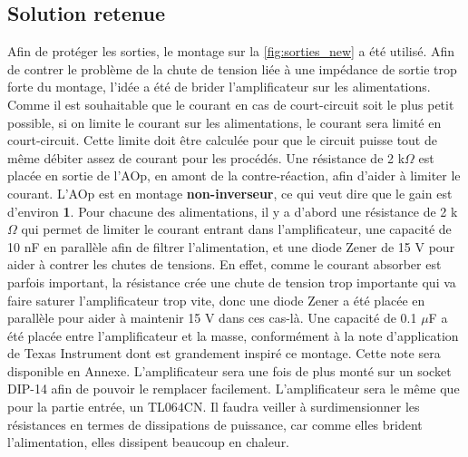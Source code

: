 \documentclass{report}
\begin{document}
\subsection{Solution retenue}
Afin de protéger les sorties, le montage sur la  \ref{fig:sorties_new} a été utilisé. Afin de contrer le problème de la chute de tension liée à une impédance de sortie trop forte du montage, l'idée a été de brider l'amplificateur sur les alimentations. Comme il est souhaitable que le courant en cas de court-circuit soit le plus petit possible, si on limite le courant sur les alimentations, le courant sera limité en court-circuit. Cette limite doit être calculée pour que le circuit puisse tout de même débiter assez de courant pour les procédés. Une résistance de 2 k$\Omega$ est placée en sortie de l'AOp, en amont de la contre-réaction, afin d'aider à limiter le courant. L'AOp est en montage \textbf{non-inverseur}, ce qui veut dire que le gain est d'environ \textbf{1}. Pour chacune des alimentations, il y a d'abord une résistance de 2 k$\Omega$ qui permet de limiter le courant entrant dans l'amplificateur, une capacité de 10 nF en parallèle afin de filtrer l'alimentation, et une diode Zener de 15 V pour aider à contrer les chutes de tensions. En effet, comme le courant absorber est parfois important, la résistance crée une chute de tension trop importante qui va faire saturer l'amplificateur trop vite, donc une diode Zener a été placée en parallèle pour aider à maintenir 15 V dans ces cas-là. Une capacité de 0.1 $\mu$F a été placée entre l'amplificateur et la masse, conformément à la note d'application de Texas Instrument dont est grandement inspiré ce montage. Cette note sera disponible en Annexe. L'amplificateur sera une fois de plus monté sur un socket DIP-14 afin de pouvoir le remplacer facilement. L'amplificateur sera le même que pour la partie entrée, un TL064CN. Il faudra veiller à surdimensionner les résistances en termes de dissipations de puissance, car comme elles brident l'alimentation, elles dissipent beaucoup en chaleur.
\end{document}
